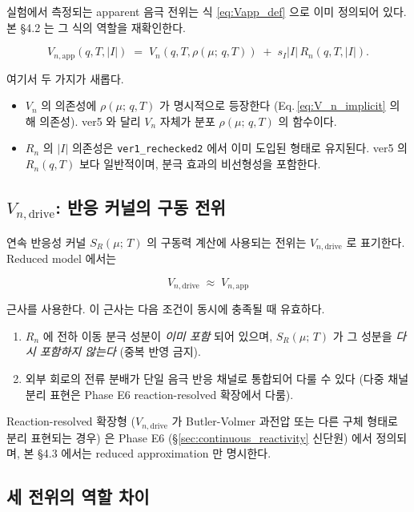\documentclass[11pt,a4paper]{article}
\newcommand{\app}{\mathrm{app}}
\newcommand{\drive}{\mathrm{drive}}
\newcommand{\mucont}{\mu}
\newcommand{\rhomu}{\rho(\mucont;\, q, T)}
\newcommand{\Sreact}{S_R(\mucont;\, T)}
\begin{document}
실험에서 측정되는 apparent 음극 전위는 식 \eqref{eq:Vapp_def} 으로 이미 정의되어
있다. 본 \S 4.2 는 그 식의 역할을 재확인한다.

\begin{equation}
V_{n,\app}(q, T, |I|)
\;=\;
V_n(q, T, \rhomu) \;+\; s_I |I|\, R_n(q, T, |I|).
\label{eq:V_n_app_role}
\end{equation}

여기서 두 가지가 새롭다.

\begin{itemize}
\item $V_n$ 의 의존성에 $\rhomu$ 가 명시적으로 등장한다 (Eq.\,\ref{eq:V_n_implicit}
      의 해 의존성). ver5 와 달리 $V_n$ 자체가 분포 $\rhomu$ 의 함수이다.
\item $R_n$ 의 $|I|$ 의존성은 \texttt{ver1\_rechecked2} 에서 이미 도입된 형태로
      유지된다. ver5 의 $R_n(q, T)$ 보다 일반적이며, 분극 효과의 비선형성을
      포함한다.
\end{itemize}

\subsection{$V_{n,\drive}$: 반응 커널의 구동 전위}
\label{sec:V_n_drive}

연속 반응성 커널 $\Sreact$ 의 구동력 계산에 사용되는 전위는 $V_{n,\drive}$ 로
표기한다. Reduced model 에서는

\begin{equation}
V_{n,\drive} \;\approx\; V_{n,\app}
\label{eq:V_n_drive_reduced}
\end{equation}

근사를 사용한다. 이 근사는 다음 조건이 동시에 충족될 때 유효하다.

\begin{enumerate}
\item $R_n$ 에 전하 이동 분극 성분이 \emph{이미 포함} 되어 있으며, $\Sreact$ 가
      그 성분을 \emph{다시 포함하지 않는다} (중복 반영 금지).
\item 외부 회로의 전류 분배가 단일 음극 반응 채널로 통합되어 다룰 수 있다
      (다중 채널 분리 표현은 Phase E6 reaction-resolved 확장에서 다룸).
\end{enumerate}

Reaction-resolved 확장형 ($V_{n,\drive}$ 가 Butler-Volmer 과전압 또는 다른
구체 형태로 분리 표현되는 경우) 은 Phase E6 (\S\ref{sec:continuous_reactivity}
신단원) 에서 정의되며, 본 \S 4.3 에서는 reduced approximation 만 명시한다.

\subsection{세 전위의 역할 차이}
\label{sec:three_potentials_roles}
\end{document}
